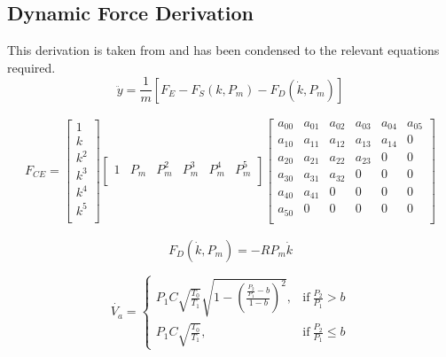 \documentclass[11pt,a4paper]{article}
\begin{document}
\begin{appendices}
\clearpage
\section{Dynamic Force Derivation}
\label{sub:dynamicforcederive}
This derivation is taken from \cite{hosovsky_2012} and has been condensed to the relevant equations required.\newline
\begin{equation}
    \ddot{y} = \frac{1}{m}[F_E-F_S(k,P_m)-F_D(\dot{k},P_m)]
\end{equation}

\begin{gather}
 F_{CE} =
 \begin{bmatrix}
    1 \\ 
    k \\
    k^2 \\
    k^3 \\
    k^4 \\
    k^5 \\
   \end{bmatrix}
 \begin{bmatrix}
    1 & P_m & P_m^2 & P_m^3 & P_m^4 & P_m^5 \\
   \end{bmatrix}
  \begin{bmatrix}
    a_{00} & a_{01} & a_{02} & a_{03} & a_{04} & a_{05} \\
    a_{10} & a_{11} & a_{12} & a_{13} & a_{14} & 0 \\
    a_{20} & a_{21} & a_{22} & a_{23} & 0      & 0 \\
    a_{30} & a_{31} & a_{32} & 0      & 0      & 0 \\
    a_{40} & a_{41} & 0      & 0      & 0      & 0 \\
    a_{50} & 0      & 0      & 0      & 0      & 0 \\
   \end{bmatrix}
\end{gather}

\begin{equation}
    F_D(\dot{k},P_m) = -RP_m\dot{k}
\end{equation}

\begin{equation}
   \dot{V_a} = \begin{cases} 
        P_1C\sqrt{\frac{T_0}{T_1}}\sqrt{1-(\frac{\frac{P_2}{P_1}-b}{1-b})^2}, & \text{if}\ \frac{P_2}{P_1} > b\\ 
        P_1C\sqrt{\frac{T_0}{T_1}}, & \text{if}\ \frac{P_2}{P_1} \leq b \end{cases}
    \label{math:v_a}
\end{equation}


\end{appendices}
\end{document}
